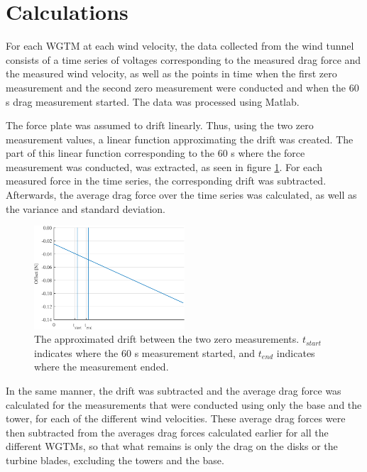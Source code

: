 \section{Calculations}

For each \gls{WGTM} at each wind velocity, the data collected from the wind tunnel consists of a time series of voltages corresponding to the measured drag force and the measured wind velocity, as well as the points in time when the first zero measurement and the second zero measurement were conducted and when the 60 \si{\s} drag measurement started. The data was processed using Matlab. 

The force plate was assumed to drift linearly. Thus, using the two zero measurement values, a linear function approximating the drift was created. The part of this linear function corresponding to the 60 \si{\s} where the force measurement was conducted, was extracted, as seen in figure \ref{Fig:driftAdjust}. For each measured force in the time series, the corresponding drift was subtracted. Afterwards, the average drag force over the time series was calculated, as well as the variance and standard deviation. 

\begin{figure}
    \centering
    \includegraphics[width=0.5\textwidth]{0_Images/DriftDown.eps}    
    \caption{The approximated drift between the two zero measurements. $t_{start}$ indicates where the 60 \si{s} measurement started, and $t_{end}$ indicates where the measurement ended.}
    \label{Fig:driftAdjust}
\end{figure}

In the same manner, the drift was subtracted and the average drag force was calculated for the measurements that were conducted using only the base and the tower, for each of the different wind velocities. These average drag forces were then subtracted from the averages drag forces calculated earlier for all the different \gls{WGTM}s, so that what remains is only the drag on the disks or the turbine blades, excluding the towers and the base. 


